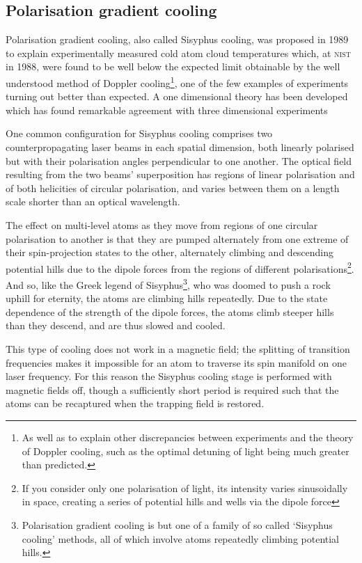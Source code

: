 \subsection{Polarisation gradient cooling}

Polarisation gradient cooling, also called Sisyphus cooling, was proposed in 1989 \cite{dalibard_laser_1989, ungar_optical_1989} to explain experimentally measured cold atom cloud temperatures \cite{lett_optical_1989} which, at \textsc{nist} in 1988, were found to be well below the expected limit obtainable by the well understood method of Doppler cooling\footnote{As well as to explain other discrepancies between experiments and the theory of Doppler cooling, such as the optimal detuning of light being much greater than predicted.}, one of the few examples of experiments turning out better than expected. A one dimensional theory has been developed \cite{dalibard_laser_1989} which has found remarkable agreement with three dimensional experiments \cite{salomon_laser_1990}

One common configuration for Sisyphus cooling comprises two counterpropagating laser beams in each spatial dimension, both linearly polarised but with their polarisation angles perpendicular to one another. The optical field resulting from the two beams' superposition has regions of linear polarisation and of both helicities of circular polarisation, and varies between them on a length scale shorter than an optical wavelength.

The effect on multi-level atoms as they move from regions of one circular polarisation to another is that they are pumped alternately from one extreme of their spin-projection states to the other, alternately climbing and descending potential hills due to the dipole forces from the regions of different polarisations\footnote{If you consider only one polarisation of light, its intensity varies sinusoidally in space, creating a series of potential hills and wells via the dipole force}. And so, like the Greek legend of Sisyphus\footnote{Polarisation gradient cooling is but one of a family of so called `Sisyphus cooling' methods, all of which involve atoms repeatedly climbing potential hills.}, who was doomed to push a rock uphill for eternity, the atoms are climbing hills repeatedly. Due to the state dependence of the strength of the dipole forces, the atoms climb steeper hills than they descend, and are thus slowed and cooled.

This type of cooling does not work in a magnetic field; the splitting of transition frequencies makes it impossible for an atom to traverse its spin manifold on one laser frequency. For this reason the Sisyphus cooling stage is performed with magnetic fields off, though a sufficiently short period is required such that the atoms can be recaptured when the trapping field is restored.

